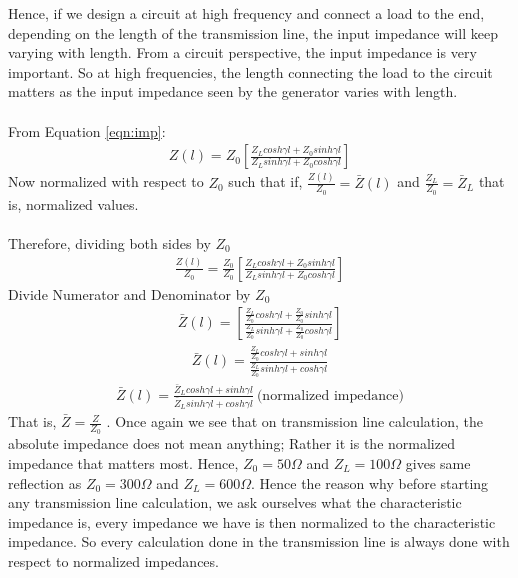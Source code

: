 Hence, if we design a circuit at high frequency and connect a load to the end, depending on the length of the transmission line, the input impedance will keep varying with length. From a circuit perspective, the input impedance is very important. So at high frequencies, the length connecting the load to the circuit matters as the input impedance seen by the generator varies with length.\\\\
From Equation \ref{eqn:imp}:
\begin{align*}
Z(l) = Z_0\left[\frac{Z_Lcosh\gamma l + Z_0sinh\gamma l}{Z_Lsinh\gamma l + Z_0cosh\gamma l}\right]
\end{align*}
Now normalized with respect to $Z_0$ such that if,
$\frac{Z(l)}{Z_0} = \bar{Z}(l)$ and $\frac{Z_L}{Z_0} =\bar{Z}_L$ that is, normalized values.\\\\
Therefore, dividing both sides by $Z_0$
\begin{align*}
\frac{Z(l)}{Z_0} = \frac{Z_0}{Z_0}[\frac{Z_Lcosh\gamma l + Z_0sinh\gamma l}{Z_Lsinh\gamma l + Z_0cosh\gamma l}] 
\end{align*}
Divide Numerator and Denominator by $Z_0$
\begin{align*}
\bar{Z}(l) =\left [ \frac{\frac{Z_L}{Z_0}cosh\gamma l + \frac{Z_0}{Z_0}sinh\gamma l}{\frac{Z_L}{Z_0}sinh\gamma l + \frac{Z_0}{Z_0}cosh\gamma l}\right]
\end{align*}
\begin{align*}
\bar{Z}(l) = \frac{\frac{Z_L}{Z_0}cosh\gamma l + sinh\gamma l}{\frac{Z_L}{Z_0}sinh\gamma l + cosh\gamma l}
\end{align*}
\begin{align}
\bar{Z}(l) = \frac{\bar{Z}_Lcosh\gamma l + sinh\gamma l}{\bar{Z}_Lsinh\gamma l + cosh\gamma l}\ \text{(normalized impedance)}
\end{align} 
That is, $\bar{Z} = \frac{Z}{Z_0}$ .
Once again we see that on transmission line calculation, the absolute impedance does not mean anything; Rather it is the normalized impedance that matters most. Hence, $Z_0 = 50\Omega$ and $Z_L = 100\Omega$ gives same reflection as $Z_0 = 300\Omega$ and $Z_L =600\Omega$. Hence the reason why before starting any transmission line calculation, we ask ourselves what the characteristic impedance is, every impedance we have is then normalized to the characteristic impedance. So every calculation done in the transmission line is always done with respect to normalized impedances.\\
